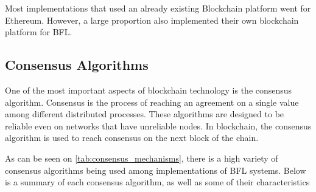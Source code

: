  Most implementations that used an already existing Blockchain platform went for Ethereum. However, a large proportion also implemented their own blockchain platform for BFL.

\subsection{Consensus Algorithms}

One of the most important aspects of blockchain technology is the consensus algorithm. Consensus is the process of reaching an agreement on a single value among different distributed processes. These algorithms are designed to be reliable even on networks that have unreliable nodes. In blockchain, the consensus algorithm is used to reach consensus on the next block of the chain.



As can be seen on \autoref{tab:consensus_mechanisms}, there is a high variety of consensus algorithms being used among implementations of BFL systems. Below is a summary of each consensus algorithm, as well as some of their characteristics


